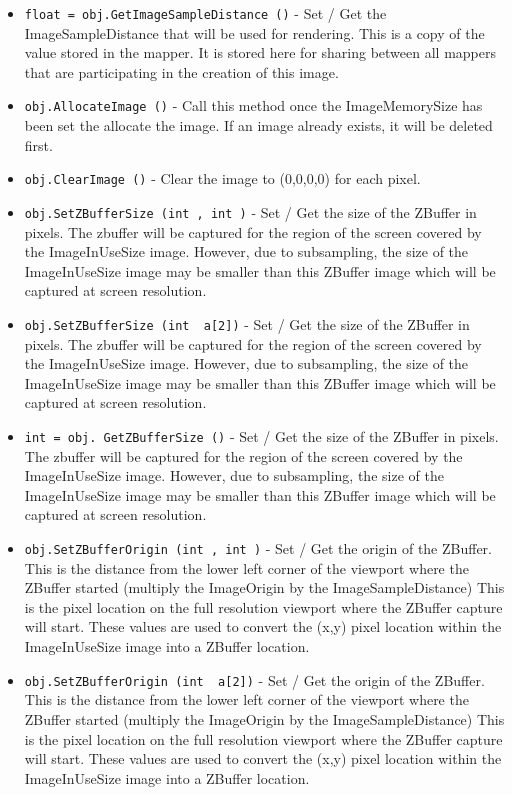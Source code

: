 \begin{itemize}
\item  \verb|float = obj.GetImageSampleDistance ()| -  Set / Get the ImageSampleDistance that will be used for 
 rendering. This is a copy of the value stored in the
 mapper. It is stored here for sharing between all mappers
 that are participating in the creation of this image.

\item  \verb|obj.AllocateImage ()| -  Call this method once the ImageMemorySize has been set
 the allocate the image. If an image already exists,
 it will be deleted first.

\item  \verb|obj.ClearImage ()| -  Clear the image to (0,0,0,0) for each pixel.

\item  \verb|obj.SetZBufferSize (int , int )| -  Set / Get the size of the ZBuffer in pixels. The zbuffer will
 be captured for the region of the screen covered by the
 ImageInUseSize image. However, due to subsampling, the size
 of the ImageInUseSize image may be smaller than this ZBuffer
 image which will be captured at screen resolution.

\item  \verb|obj.SetZBufferSize (int  a[2])| -  Set / Get the size of the ZBuffer in pixels. The zbuffer will
 be captured for the region of the screen covered by the
 ImageInUseSize image. However, due to subsampling, the size
 of the ImageInUseSize image may be smaller than this ZBuffer
 image which will be captured at screen resolution.

\item  \verb|int = obj. GetZBufferSize ()| -  Set / Get the size of the ZBuffer in pixels. The zbuffer will
 be captured for the region of the screen covered by the
 ImageInUseSize image. However, due to subsampling, the size
 of the ImageInUseSize image may be smaller than this ZBuffer
 image which will be captured at screen resolution.

\item  \verb|obj.SetZBufferOrigin (int , int )| -  Set / Get the origin of the ZBuffer. This is the distance
 from the lower left corner of the viewport where the ZBuffer
 started (multiply the ImageOrigin by the ImageSampleDistance)
 This is the pixel location on the full resolution viewport
 where the ZBuffer capture will start. These values are used 
 to convert the (x,y) pixel location within the ImageInUseSize 
 image into a ZBuffer location.

\item  \verb|obj.SetZBufferOrigin (int  a[2])| -  Set / Get the origin of the ZBuffer. This is the distance
 from the lower left corner of the viewport where the ZBuffer
 started (multiply the ImageOrigin by the ImageSampleDistance)
 This is the pixel location on the full resolution viewport
 where the ZBuffer capture will start. These values are used 
 to convert the (x,y) pixel location within the ImageInUseSize 
 image into a ZBuffer location.


\end{itemize}
